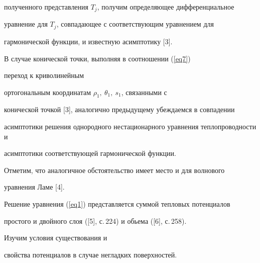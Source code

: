 \begin{pf}
полученного представления $T_{j} $, получим определяющее дифференциальное 


уравнение для $T_{j}$, совпадающее с соответствующим уравнением для 


гармонической функции, и известную асимптотику [3].





В случае конической точки, выполняя в соотношении (\ref{eq7}) 


переход к криволинейным 


ортогональным координатам $\rho_{1},\ \theta_{1},\ s_{1} $, связанными с 


конической точкой [3], аналогично предыдущему убеждаемся в совпадении 


асимптотики решения однородного нестационарного уравнения теплопроводности и 


асимптотики соответствующей гармонической функции.


\end{pf}





Отметим, что аналогичное обстоятельство имеет место и для волнового 


уравнения Ламе [4].





Решение уравнения (\ref{eq1}) представляется суммой тепловых потенциалов 


простого и двойного слоя ([5], с.\,224) и обьема ([6], с.\,258).


Изучим условия существования и 


свойства потенциалов в случае негладких поверхностей. 








